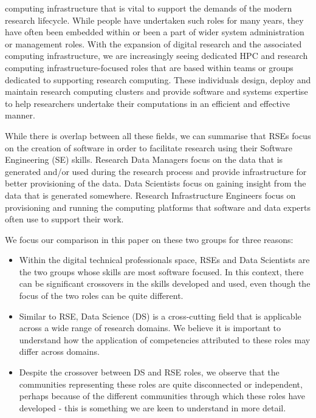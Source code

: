 \documentclass[
        english,biblatex
    ]{lni}
\providecommand{\tightlist}{%
    \setlength{\itemsep}{0pt}\setlength{\parskip}{0pt}}
\begin{document}
\begin{itemize}
      computing infrastructure that is vital to support the demands of
      the modern research lifecycle. While people have undertaken such
      roles for many years, they have often been embedded within or been
      a part of wider system administration or management roles. With
      the expansion of digital research and the associated computing
      infrastructure, we are increasingly seeing dedicated HPC and
      research computing infrastructure-focused roles that are based
      within teams or groups dedicated to supporting research computing.
      These individuals design, deploy and maintain research computing
      clusters and provide software and systems expertise to help
      researchers undertake their computations in an efficient and
      effective manner.
    \end{itemize}

    While there is overlap between all these fields, we can summarise
    that RSEs focus on the creation of software in order to facilitate
    research using their Software Engineering (SE) skills. Research Data
    Managers focus on the data that is generated and/or used during the
    research process and provide infrastructure for better provisioning
    of the data. Data Scientists focus on gaining insight from the data
    that is generated somewhere. Research Infrastructure Engineers focus
    on provisioning and running the computing platforms that software
    and data experts often use to support their work.

    We focus our comparison in this paper on these two groups for three
    reasons:

    \begin{itemize}
    \tightlist
    \item
      Within the digital technical professionals space, RSEs and Data
      Scientists are the two groups whose skills are most software
      focused. In this context, there can be significant crossovers in
      the skills developed and used, even though the focus of the two
      roles can be quite different.
    \item
      Similar to RSE, Data Science (DS) is a cross-cutting field that is
      applicable across a wide range of research domains. We believe it
      is important to understand how the application of competencies
      attributed to these roles may differ across domains.
    \item
      Despite the crossover between DS and RSE roles, we observe that
      the communities representing these roles are quite disconnected or
      independent, perhaps because of the different communities through
      which these roles have developed - this is something we are keen
      to understand in more detail.
    \end{itemize}
\end{document}
